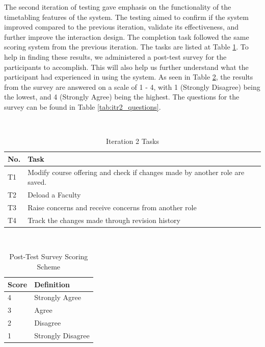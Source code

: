 The second iteration of testing gave emphasis on the functionality of the timetabling features of the system. The testing aimed to confirm if the system improved compared to the previous iteration, validate its effectiveness, and further improve the interaction design. The completion task followed the same scoring system from the previous iteration. The tasks are listed at Table \ref{tab:tasks2}. To help in finding these results, we administered a post-test survey for the participants to accomplish. This will also help us further understand what the participant had experienced in using the system. As seen in Table \ref{tab:scoring_scheme}, the results from the survey are answered on a scale of 1 - 4, with 1 (Strongly Disagree) being the lowest, and 4 (Strongly Agree) being the highest. The questions for the survey can be found in Table \ref{tab:itr2_questions}. 

\begin{table}
  \centering
  \caption{Iteration 2 Tasks}~\label{tab:tasks2}
  \addtolength{\tabcolsep}{2pt} 
  \begin{tabular}{p{0.5cm}|p{6.5cm}}
  	\toprule
    \rule{0pt}{8pt}No. & Task \\[2pt]
    \toprule
    T1 & Modify course offering and check if changes made by another role are saved. \\
    T2 & Deload a Faculty \\
    T3 & Raise concerns and receive concerns from another role \\
    T4 & Track the changes made through revision history \\
    \bottomrule
  \end{tabular}
  \addtolength{\tabcolsep}{-2pt} 
\end{table}

\begin{table}
  \centering
  \caption{Post-Test Survey Scoring Scheme}~\label{tab:scoring_scheme}
  \addtolength{\tabcolsep}{2pt} 
  \begin{tabular}{p{1cm}|p{5cm}}
  	\toprule
    \rule{0pt}{8pt}Score & Definition\\[2pt]
    \toprule
    4 & Strongly Agree \\
    3 & Agree \\
    2 & Disagree \\
    1 & Strongly Disagree \\
    \bottomrule
  \end{tabular}
  \addtolength{\tabcolsep}{-2pt} 
\end{table}

